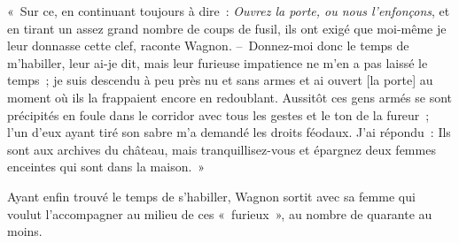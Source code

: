 \documentclass[french,twoside]{book} %
\newenvironment{quoteblock}%
  {\begin{quoting}}
  {\end{quoting}}
\newenvironment{quotebar}{%
    \def\FrameCommand{{\color{rubric!10!}\vrule width 0.5em} \hspace{0.9em}}%
    \def\OuterFrameSep{\itemsep} %
    \MakeFramed {\advance\hsize-\width \FrameRestore}
  }%
  {%
    \endMakeFramed
  }
\renewenvironment{quoteblock}%
  {%
    \savenotes
    \setstretch{0.9}
    \normalfont
    \begin{quotebar}
  }
  {%
    \end{quotebar}
    \spewnotes
  }
\begin{document}
\begin{quoteblock}
 \noindent « Sur ce, en continuant toujours à dire : \emph{Ouvrez la porte, ou nous l’enfonçons}, et en tirant un assez grand nombre de coups de fusil, ils ont exigé que moi-même je leur donnasse cette clef, raconte Wagnon. – Donnez-moi donc le temps de m’habiller, leur ai-je dit, mais leur furieuse impatience ne m’en a pas laissé le temps ; je suis descendu à peu près nu et sans armes et ai ouvert [la porte] au moment où ils la frappaient encore en redoublant. Aussitôt ces gens armés se sont précipités en foule dans le corridor avec tous les gestes et le ton de la fureur ; l’un d’eux ayant tiré son sabre m’a demandé les droits féodaux. J’ai répondu : Ils sont aux archives du château, mais tranquillisez-vous et épargnez deux femmes enceintes qui sont dans la maison. »
 \end{quoteblock}

\noindent Ayant enfin trouvé le temps de s’habiller, Wagnon sortit avec sa femme qui voulut l’accompagner au milieu de ces « furieux », au nombre de quarante au moins.\par
\end{document}

